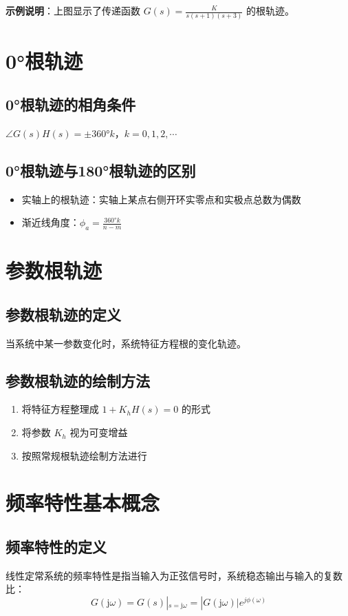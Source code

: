 \documentclass[12pt,a4paper]{article}
\newcommand{\jw}{\mathrm{j}\omega}
\begin{document}
\textbf{示例说明}：上图显示了传递函数 $G(s) = \frac{K}{s(s+1)(s+3)}$ 的根轨迹。

\section{0°根轨迹}

\subsection{0°根轨迹的相角条件}
$\angle G(s)H(s) = \pm 360°k$，$k = 0, 1, 2, \cdots$

\subsection{0°根轨迹与180°根轨迹的区别}
\begin{itemize}
    \item 实轴上的根轨迹：实轴上某点右侧开环实零点和实极点总数为偶数
    \item 渐近线角度：$\phi_a = \frac{360°k}{n-m}$
\end{itemize}

\section{参数根轨迹}

\subsection{参数根轨迹的定义}
当系统中某一参数变化时，系统特征方程根的变化轨迹。

\subsection{参数根轨迹的绘制方法}
\begin{enumerate}
    \item 将特征方程整理成 $1 + K_h H(s) = 0$ 的形式
    \item 将参数 $K_h$ 视为可变增益
    \item 按照常规根轨迹绘制方法进行
\end{enumerate}

\section{频率特性基本概念}

\subsection{频率特性的定义}
线性定常系统的频率特性是指当输入为正弦信号时，系统稳态输出与输入的复数比：
\[G(\jw) = G(s)|_{s=\jw} = |G(\jw)|e^{j\phi(\omega)}\]
\end{document}
